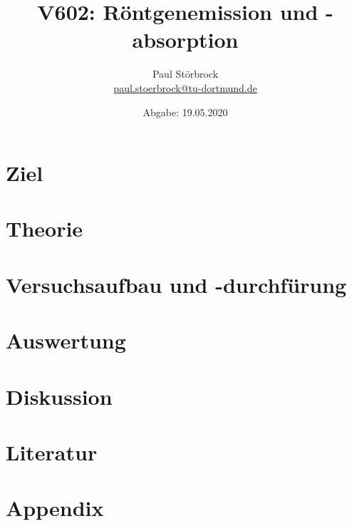 
\usepackage{tikz}

\newcommand*\circled[1]{\tikz[baseline=(char.base)]{
            \node[shape=circle,draw,inner sep=2pt] (char) {#1};}}


    \title{V602: Röntgenemission und -absorption}
    \author{  
    Paul Störbrock\\
    \texorpdfstring{\href{mailto:paul.stoerbrock@tu-dortmund.de}{paul.stoerbrock@tu-dortmund.de}}{}
    }
    \date{Abgabe: 19.05.2020\vspace{-4ex}}
\maketitle
    
\newpage
\tableofcontents
\newpage

\setcounter{page}{1}

\section{Ziel}

\section{Theorie}

\section{Versuchsaufbau und -durchfürung}

\section{Auswertung}

\section{Diskussion}

\newpage
\section{Literatur}

\newpage
\section{Appendix}